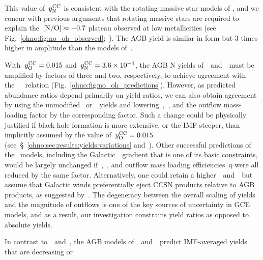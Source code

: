This value of~$y_\text{N}^\text{CC}$ is consistent with the rotating massive star models of
\mbox{\citet{Limongi2018}}, and we concur with previous arguments that rotating
massive
stars are required to explain the~$\text{[N/O]} \approx -0.7$ plateau observed at low
metallicities (see Fig.~\ref{ohno:fig:no_oh_observed};~\citealp{Chiappini2003,
Chiappini2005, Chiappini2006, Kobayashi2011, Prantzos2018, Grisoni2021}).
The AGB yield is similar in form but 3 times higher in amplitude than the
models of~\cristallo.
\par
With~$y_\text{O}^\text{CC} = 0.015$ and~$y_\text{N}^\text{CC} = 3.6\times10^{-4}$, the AGB N yields
of~\cristallo~and~\ventura~must be amplified by factors of three and two,
respectively, to achieve agreement with
the~\mbox{\citet{Dopita2016}}~\ohno~relation (Fig.~\ref{ohno:fig:no_oh_predictions}).
However, as predicted abundance ratios depend primarily on yield ratios, we can
also obtain agreement by using the
unmodified
\cristallo~or~\ventura~yields and
lowering~,~, and the
outflow mass-loading factor by the corresponding factor.
Such a change could be physically justified if black hole formation is more
extensive, or the IMF steeper, than implicitly assumed by the value
of~$y_\text{O}^\text{CC} = 0.015$ (see~\S~\ref{ohno:sec:results:yields:variations}
and~\mbox{\citealp{Griffith2021b}}).
Other successful predictions of the~\mbox{\citet{Johnson2021}} models,
including the
Galactic~\oh~gradient that is one of its basic constraints, would be largely
unchanged if~,~, and outflow mass loading efficiencies~$\eta$
were all reduced by the same factor.
Alternatively, one could retain a higher~~and~~but assume that
Galactic winds preferentially eject CCSN products relative to AGB products, as
suggested by~\mbox{\citet{Vincenzo2016a}}.
The degeneracy between the overall scaling of yields and the magnitude of
outflows is one of the key sources of uncertainty in GCE models,
and as a result, our investigation constrains yield ratios as opposed to
absolute yields.
\par
In contrast to~\cristallo~and~\ventura, the AGB models
of~\karakasten~and~\karakas~predict IMF-averaged yields that are decreasing or
